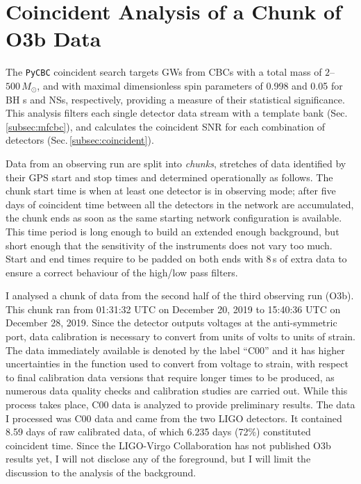 \documentclass[binding=0.6cm, LaM]{sapthesis}
\begin{document}
\section{Coincident Analysis of a Chunk of O3b Data}
\label{sec:pycbc00}
	The {\texttt{PyCBC}} coincident search targets GWs from CBCs with a total mass of $2$--$500\,M_\odot$,
        and with maximal dimensionless spin parameters of 0.998 and 0.05 for BH s and NSs, respectively,
        providing a measure of their statistical significance.
        This analysis filters each single detector data stream with a template bank (Sec.\,\ref{subsec:mfcbc}),
        and calculates the coincident SNR for each combination of detectors (Sec.\,\ref{subsec:coincident}).

	Data from an observing run are split into \emph{chunks},
	stretches of data identified by their GPS start and stop times and
	determined operationally as follows.
	The chunk start time is when at least one detector is in observing mode;
	after five days of coincident time between all the detectors in the network are accumulated,
	the chunk ends as soon as the same starting network configuration is available.
        This time period is long enough to build an extended enough background, 
	but short enough that the sensitivity of the instruments does not vary too much. 
	Start and end times require to be padded on both ends with 8\,s of extra data 	
	to ensure a correct behaviour of the high/low pass filters.

        I analysed a chunk of data from the second half of the third observing run (O3b).
	This chunk ran from 01:31:32 UTC on December 20, 2019 to 15:40:36 UTC on December 28, 2019.
	Since the detector outputs voltages at the anti-symmetric port, 
	data calibration is necessary to convert from units of volts to units of strain.
	The data immediately available is denoted by the label ``C00''
	and it has higher uncertainties in the function used to convert from voltage to strain, 
	with respect to final calibration data versions that require longer times to be produced, as
        numerous data quality checks and calibration studies are carried out.
        While this process takes place, C00 data is analyzed to provide preliminary results.
	The data I processed was C00 data and came from the two LIGO detectors.
	It contained 8.59 days of raw calibrated data,
        of which 6.235 days (72\%) constituted coincident time.
        Since the LIGO-Virgo Collaboration has not published O3b results yet, 
	I will not disclose any of the foreground, but I will limit the discussion to the analysis of the background.
\end{document}
